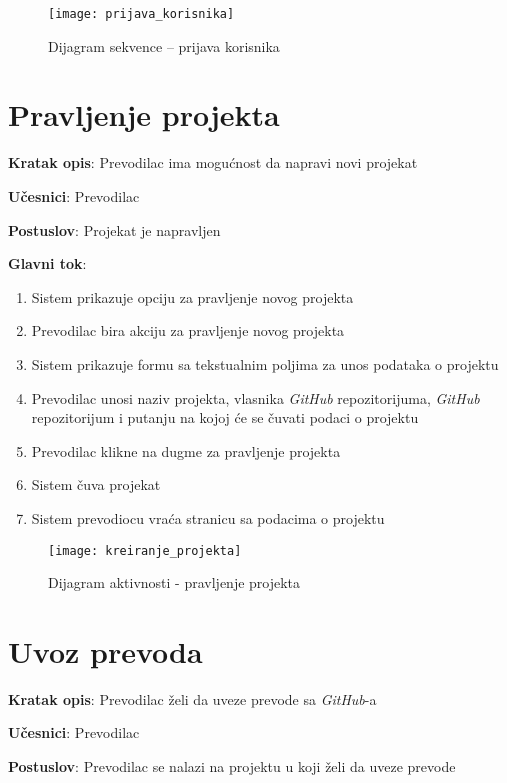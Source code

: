 \begin{figure}[H]
    \centering
    \texttt{[image: prijava\_korisnika]}
    \caption{Dijagram sekvence -- prijava korisnika}
\end{figure}


\section{Pravljenje projekta}

\textbf{Kratak opis}: Prevodilac ima mogućnost da napravi novi projekat

\textbf{Učesnici}: Prevodilac

\textbf{Postuslov}: Projekat je napravljen

\textbf{Glavni tok}:
\begin{enumerate}
    \item Sistem prikazuje opciju za pravljenje novog projekta
    \item Prevodilac bira akciju za pravljenje novog projekta
    \item Sistem prikazuje formu sa tekstualnim poljima za unos podataka o projektu
    \item Prevodilac unosi naziv projekta, vlasnika \textit{GitHub} repozitorijuma, 
    \textit{GitHub} repozitorijum i putanju na kojoj će se čuvati podaci o projektu
    \item Prevodilac klikne na dugme za pravljenje projekta
    \item Sistem čuva projekat
    \item Sistem prevodiocu vraća stranicu sa podacima o projektu
\end{enumerate}

\begin{figure}[H]
    \centering
    \texttt{[image: kreiranje\_projekta]}
    \caption{Dijagram aktivnosti - pravljenje projekta}
\end{figure}


\section{Uvoz prevoda}

\textbf{Kratak opis}: Prevodilac želi da uveze prevode sa \textit{GitHub}-a

\textbf{Učesnici}: Prevodilac

\textbf{Postuslov}: Prevodilac se nalazi na projektu u koji želi da uveze prevode


